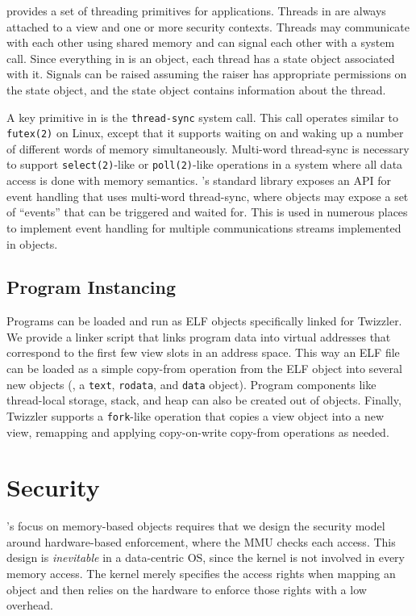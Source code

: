 \Twizzler provides a set of threading primitives for applications. Threads in \Twizzler are always
attached to a view and one or more security contexts. Threads may communicate with each other using
shared memory and can signal each other with a system call.
Since everything in \Twizzler is an object, each thread has a state object associated
with it. Signals can be raised assuming the raiser has appropriate permissions on the state object,
and the state object contains information about the thread.

A key primitive in \Twizzler is the \texttt{thread-sync} system call. This call operates similar to
\texttt{futex(2)} on Linux, except that it supports waiting on and waking up a number of different
words of memory simultaneously. Multi-word thread-sync is necessary to support
\texttt{select(2)}-like or \texttt{poll(2)}-like operations in a system where all data access is
done with memory semantics. \Twizzler's standard library exposes an API for event handling that uses
multi-word thread-sync, where objects may expose a set of ``events'' that can be triggered and waited for. This is
used in numerous places to implement event handling for multiple communications streams implemented
in objects.

\subsection{Program Instancing}

Programs can be loaded and run as ELF objects specifically linked for Twizzler. We provide a linker script that links
program data into virtual addresses that correspond to the first few view slots in an address space. This way an ELF
file can be loaded as a simple copy-from operation from the ELF object into several new objects (\eg, a \texttt{text},
\texttt{rodata}, and \texttt{data} object). Program components like thread-local storage, stack, and heap can also be
created out of objects. Finally, Twizzler supports a \texttt{fork}-like operation that copies a view object into a new
view, remapping and applying copy-on-write copy-from operations as needed.

\section{Security}
\label{sec:sec}


\Twizzler's focus on memory-based objects requires that we design the security model around
hardware-based enforcement, where the MMU checks
each access. This design is \emph{inevitable} in a data-centric OS, since the
kernel is not involved in every memory access. The kernel merely specifies the access rights when
mapping an object and then relies on the hardware to enforce those rights with a low overhead.


